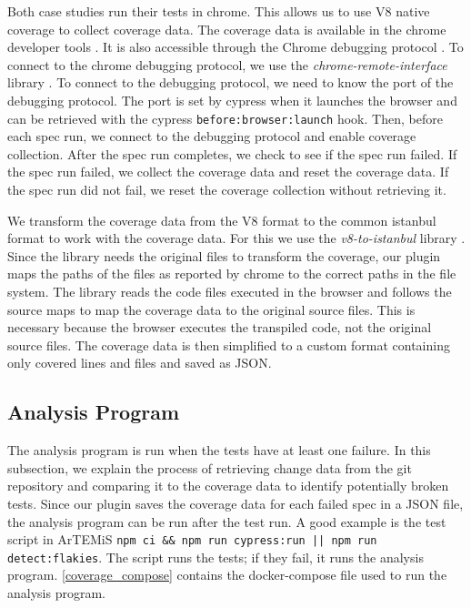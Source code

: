 Both case studies run their tests in chrome.
This allows us to use V8 native coverage to collect coverage data.
The coverage data is available in the chrome developer tools \autocite{kayce_basques_coverage_2020}.
It is also accessible through the Chrome debugging protocol \autocite{noauthor_chrome_nodate}.
To connect to the chrome debugging protocol, we use the \emph{chrome-remote-interface} library \autocite{cardaci_chrome-remote-interface_2023}.
To connect to the debugging protocol, we need to know the port of the debugging protocol.
The port is set by cypress when it launches the browser and can be retrieved with the cypress \texttt{before:browser:launch} hook.
Then, before each spec run, we connect to the debugging protocol and enable coverage collection.
After the spec run completes, we check to see if the spec run failed.
If the spec run failed, we collect the coverage data and reset the coverage data.
If the spec run did not fail, we reset the coverage collection without retrieving it.

We transform the coverage data from the V8 format to the common istanbul format to work with the coverage data.
For this we use the \emph{v8-to-istanbul} library \autocite{noauthor_v8--istanbul_2023}.
Since the library needs the original files to transform the coverage, our plugin maps the paths of the files as reported by chrome to the correct paths in the file system.
The library reads the code files executed in the browser and follows the source maps to map the coverage data to the original source files.
This is necessary because the browser executes the transpiled code, not the original source files.
The coverage data is then simplified to a custom format containing only covered lines and files and saved as JSON.

\subsection{Analysis Program}
The analysis program is run when the tests have at least one failure.
In this subsection, we explain the process of retrieving change data from the git repository and comparing it to the coverage data to identify potentially broken tests.
Since our plugin saves the coverage data for each failed spec in a JSON file, the analysis program can be run after the test run.
A good example is the test script in ArTEMiS \texttt{npm ci \&\& npm run cypress:run || npm run detect:flakies}. The script runs the tests; if they fail, it runs the analysis program.
\cref{coverage_compose} contains the docker-compose file used to run the analysis program.

